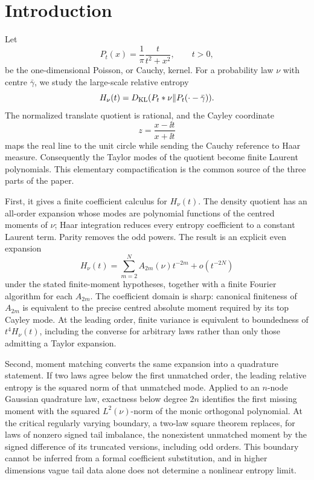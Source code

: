 \section{Introduction}\label{sec:introduction}

Let
\[
 P_t(x)=\frac1\pi\frac{t}{t^2+x^2},\qquad t>0,
\]
be the one-dimensional Poisson, or Cauchy, kernel.  For a probability law
\(\nu\) with centre \(\bar\gamma\), we study the large-scale relative
entropy
\[
 H_\nu(t)=D_{\rm KL}(P_t*\nu\|P_t(\mathord\cdot-\bar\gamma)).
\]
The normalized translate quotient is rational, and the Cayley coordinate
\[
 z=\frac{x-\ii t}{x+\ii t}
\]
maps the real line to the unit circle while sending the Cauchy reference to
Haar measure.  Consequently the Taylor modes of the quotient become finite
Laurent polynomials.  This elementary compactification is the common source
of the three parts of the paper.

First, it gives a finite coefficient calculus for \(H_\nu(t)\).  The density
quotient has an all-order expansion whose modes are polynomial functions of
the centred moments of \(\nu\); Haar integration reduces every entropy
coefficient to a constant Laurent term.  Parity removes the odd powers.  The
result is an explicit even expansion
\[
 H_\nu(t)=\sum_{m=2}^{N}A_{2m}(\nu)t^{-2m}+o(t^{-2N})
\]
under the stated finite-moment hypotheses, together with a finite Fourier
algorithm for each \(A_{2m}\).  The coefficient domain is sharp: canonical
finiteness of \(A_{2m}\) is equivalent to the precise centred absolute
moment required by its top Cayley mode.  At the leading order, finite
variance is equivalent to boundedness of \(t^4H_\nu(t)\), including the
converse for arbitrary laws rather than only those admitting a Taylor
expansion.

Second, moment matching converts the same expansion into a quadrature
statement.  If two laws agree below the first unmatched order, the leading
relative entropy is the squared norm of that unmatched mode.  Applied to an
\(n\)-node Gaussian quadrature law, exactness below degree \(2n\) identifies
the first missing moment with the squared \(L^2(\nu)\)-norm of the monic
orthogonal polynomial.  At the critical regularly varying boundary, a
two-law square theorem replaces, for laws of nonzero signed tail imbalance,
the nonexistent unmatched moment by the signed difference of its truncated
versions, including odd orders.  This
boundary cannot be inferred from a formal coefficient substitution, and in
higher dimensions vague tail data alone does not determine a nonlinear
entropy limit.

